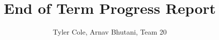 \documentclass[10pt,journal,compsoc,onecolumn,draftclsnofoot]{IEEEtran}
\begin{document}
%
\title{End of Term Progress Report}
%
%
%
%

\author{Tyler Cole, Arnav Bhutani, Team 20}%
% 
%
\end{document}
